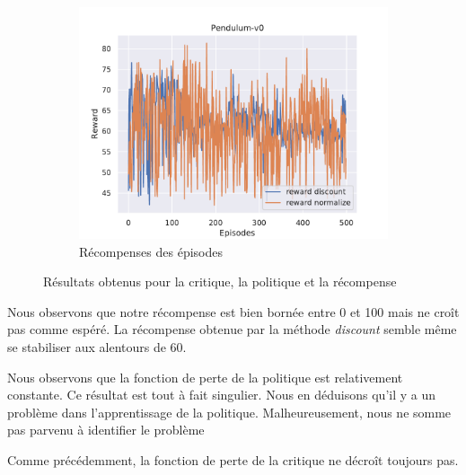 \begin{figure}[H]
    \begin{subfigure}{0.3\textwidth}
        \includegraphics[width=\textwidth]{figures/iteration3/rewards_Pendulum-v0_pg_dataset_td_eval_True_cycles_500_trajs_20_batches_20_gamma_0.99_nstep_5_lr_ac.pdf}
        \caption{Récompenses des épisodes}
    \end{subfigure}
    \caption{Résultats obtenus pour la critique, la politique et la récompense}
    \label{fig:itr3_results}
\end{figure}

Nous observons que notre récompense est bien bornée entre 0 et 100 mais ne croît pas comme espéré. La récompense obtenue par la méthode \emph{discount} semble même se stabiliser aux alentours de 60.

Nous observons que la fonction de perte de la politique est relativement constante. Ce résultat est tout à fait singulier. Nous en déduisons qu'il y a un problème dans l'apprentissage de la politique. Malheureusement, nous ne somme pas parvenu à identifier le problème

Comme précédemment, la fonction de perte de la critique ne décroît toujours pas.

